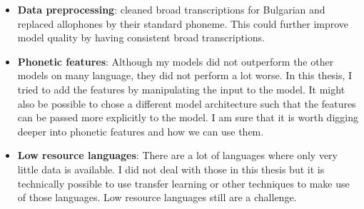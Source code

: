 \begin{itemize}
\item \textbf{Data preprocessing}: \cite{Ashby-Bartley.2021} cleaned broad transcriptions for Bulgarian and replaced allophones by their standard phoneme. This could further improve model quality by having consistent broad transcriptions.
\item \textbf{Phonetic features}: Although my models did not outperform the other models on many language, they did not perform a lot worse. In this thesis, I tried to add the features by manipulating the input to the model. It might also be possible to chose a different model architecture such that the features can be passed more explicitly to the model. I am sure that it is worth digging deeper into phonetic features and how we can use them.
\item \textbf{Low resource languages}: There are a lot of languages where only very little data is available. I did not deal with those in this thesis but it is technically possible to use transfer learning or other techniques to make use of those languages. Low resource languages still are a challenge.
\end{itemize}